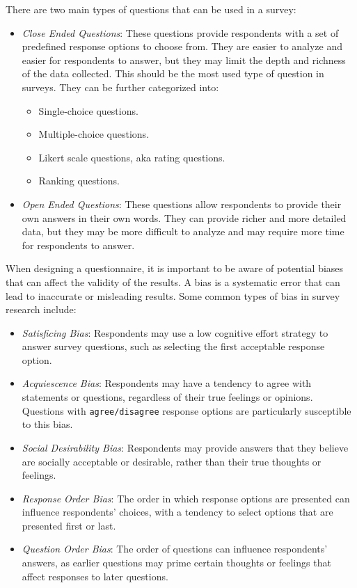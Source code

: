 \begin{enumerate}
    There are two main types of questions that can be used in a survey:
    \begin{itemize}
        \item \emph{Close Ended Questions}: These questions provide respondents with a set of predefined response options to choose from. They are easier to analyze and easier for respondents to answer, but they may limit the depth and richness of the data collected. This should be the most used type of question in surveys. They can be further categorized into:
        \begin{itemize}
            \item Single-choice questions.
            \item Multiple-choice questions.
            \item Likert scale questions, aka rating questions.
            \item Ranking questions.
        \end{itemize}
        \item \emph{Open Ended Questions}: These questions allow respondents to provide their own answers in their own words. They can provide richer and more detailed data, but they may be more difficult to analyze and may require more time for respondents to answer.
    \end{itemize}

    When designing a questionnaire, it is important to be aware of potential biases that can affect the validity of the results. A bias is a systematic error that can lead to inaccurate or misleading results. Some common types of bias in survey research include:
    \begin{itemize}
        \item \emph{Satisficing Bias}: Respondents may use a low cognitive effort strategy to answer survey questions, such as selecting the first acceptable response option.
        \item \emph{Acquiescence Bias}: Respondents may have a tendency to agree with statements or questions, regardless of their true feelings or opinions. Questions with \verb|agree/disagree| response options are particularly susceptible to this bias.
        \item \emph{Social Desirability Bias}: Respondents may provide answers that they believe are socially acceptable or desirable, rather than their true thoughts or feelings.
        \item \emph{Response Order Bias}: The order in which response options are presented can influence respondents' choices, with a tendency to select options that are presented first or last.
        \item \emph{Question Order Bias}: The order of questions can influence respondents' answers, as earlier questions may prime certain thoughts or feelings that affect responses to later questions.
    \end{itemize}


\end{enumerate}
